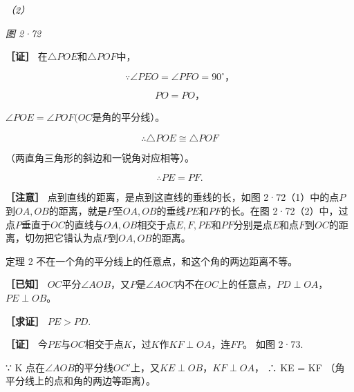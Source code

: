 \emph{（2）}

\emph{图 2·72}

\textbf{［证］} 在\(\triangle POE\)和\(\triangle POF\)中，

\[
\because \angle PEO = \angle PFO = 90 ^{\circ}\text{，}
\]

\[
PO = PO\text{，}
\]

\(\angle POE = \angle POF(OC\)是角的平分线）。

\[
\therefore \triangle POE \cong \triangle POF
\]

（两直角三角形的斜边和一锐角对应相等）。

\[
\therefore PE = PF.
\]

\textbf{［注意］} 点到直线的距离，是点到这直线的垂线的长，如图
2·72（1）中的点\(P\)到\(OA, OB\)的距离，就是\(P\)至\(OA, OB\)的垂线\(PE\)和\(PF\)的长。在图
2·72（2）中，过点\(P\)垂直于\(OC\)的直线与\(OA, OB\)相交于点\(E, F, PE\)和\(PF\)分别是点\(E\)和点\(F\)到\(OC\)的距离，切勿把它错认为点\(P\)到\(OA, OB\)的距离。

定理 2 不在一个角的平分线上的任意点，和这个角的两边距离不等。

\textbf{［已知］}
\(OC\)平分\(\angle AOB\)，又\(P\)是\(\angle AOC\)内不在\(OC\)上的任意点，\(PD \perp OA\)，\(PE \perp OB\)。

\textbf{［求证］} \(PE > PD.\)

\textbf{［证］}
今\(PE\)与\(OC\)相交于点\(K\)，过\(K\)作\(KF \perp OA\)，连\(FP\)。 如图
2·73.

∵ K
点在\(\angle AOB\)的平分线\(OC'\)上，又\(KE \perp OB\)，\(KF \perp OA\)，
∴ KE = KF （角平分线上的点和角的两边等距离）。

